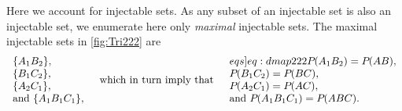 Here we account for injectable sets. As any subset of an injectable set is also an injectable set, we enumerate here only \emph{maximal} injectable sets. The maximal injectable sets in \cref{fig:Tri222} are
\begin{align}
\begin{array}{l}
\brackets{A_1 B_2},\\
\brackets{B_1 C_2},\\
\brackets{A_2 C_1},\\
\text{and }\brackets{A_1 B_1 C_1},
\end{array}
\quad\text{which in turn imply that}\quad
\begin{array}{l}\label[eqs]{eq:dmap222}
\pdf{A_1 B_2}=\pdf{A B},\\
\pdf{B_1 C_2}=\pdf{B C},\\
\pdf{A_2 C_1}=\pdf{A C},\\
\text{and }\pdf{A_1 B_1 C_1}=\pdf{A B C}.
\end{array}\end{align}


